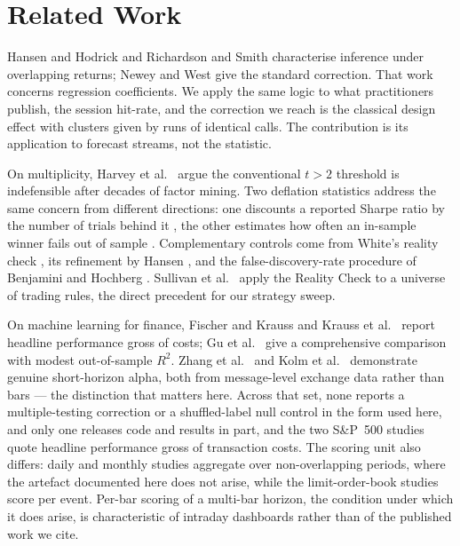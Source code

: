 \documentclass[conference]{IEEEtran}
\begin{document}
\section{Related Work}

Hansen and Hodrick \cite{hansen1980} and Richardson and Smith
\cite{richardson1991} characterise inference under overlapping returns; Newey
and West \cite{newey1987} give the standard correction. That work concerns
regression coefficients. We apply the same logic to what practitioners publish,
the session hit-rate, and the correction we reach is the classical design effect
\cite{kish1965,moulton1990} with clusters given by runs of identical calls. The
contribution is its application to forecast streams, not the statistic.

On multiplicity, Harvey et al.\ \cite{harvey2016} argue the conventional $t>2$
threshold is indefensible after decades of factor mining. Two deflation statistics address the
same concern from different directions: one discounts a reported Sharpe ratio by
the number of trials behind it \cite{bailey2014}, the other estimates how often
an in-sample winner fails out of sample \cite{bailey2017}. Complementary
controls come from White's reality check \cite{white2000}, its refinement by
Hansen \cite{hansen2005}, and the false-discovery-rate procedure of Benjamini
and Hochberg \cite{bh1995}. Sullivan et
al.\ \cite{sullivan1999} apply the Reality Check to a universe of trading rules,
the direct precedent for our strategy sweep.

On machine learning for finance, Fischer and Krauss \cite{fischer2018} and
Krauss et al.\ \cite{krauss2017} report headline performance gross of costs; Gu
et al.\ \cite{gu2020} give a comprehensive comparison with modest out-of-sample
$R^2$. Zhang et al.\ \cite{zhang2019} and Kolm et al.\ \cite{kolm2023}
demonstrate genuine short-horizon alpha, both from message-level exchange data
rather than bars --- the distinction that matters here. Across that set, none reports a
multiple-testing correction or a shuffled-label null control in the form used
here, and only one releases code and results in part, and the two S\&P~500 studies quote headline
performance gross of transaction costs. The scoring unit also differs: daily and
monthly studies aggregate over non-overlapping periods, where the artefact
documented here does not arise, while the limit-order-book studies score per
event. Per-bar scoring of a multi-bar horizon, the condition under which it
does arise, is characteristic of intraday dashboards rather than of the
published work we cite.
\end{document}
